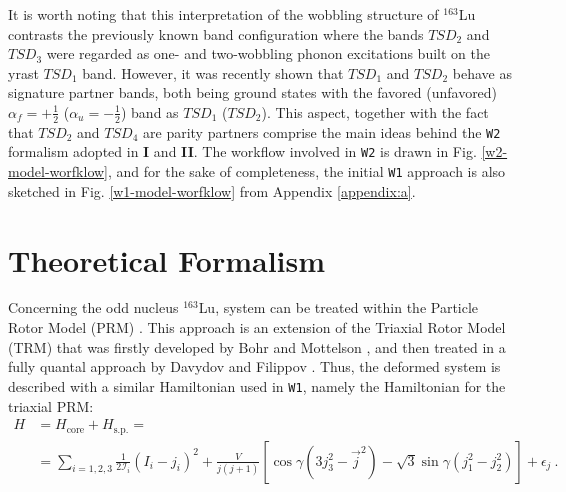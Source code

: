 \documentclass[myclassdoc,debug]{rjparticle}
\begin{document}
It is worth noting that this interpretation of the wobbling structure of $^{163}$Lu contrasts the previously known band configuration \cite{jensen2004coexisting,tanabe2006algebraic,frauendorf2014transverse} where the bands $TSD_2$ and $TSD_3$ were regarded as one- and two-wobbling phonon excitations built on the yrast $TSD_1$ band. However, it was recently shown \cite{raduta2020towards,raduta2020approach,raduta2020new} that $TSD_1$ and $TSD_2$ behave as signature partner bands, both being ground states with the favored (unfavored) $\alpha_f=+\frac{1}{2}$ ($\alpha_u=-\frac{1}{2}$) band as $TSD_1$ ($TSD_2$). This aspect, together with the fact that $TSD_2$ and $TSD_4$ are parity partners comprise the main ideas behind the \texttt{W2} formalism adopted in \textbf{I} and \textbf{II}. The workflow involved in \texttt{W2} is drawn in Fig. \ref{w2-model-worfklow}, and for the sake of completeness, the initial \texttt{W1} approach is also sketched in Fig. \ref{w1-model-worfklow} from Appendix \ref{appendix:a}.

\section{Theoretical Formalism}\label{section-theory}

Concerning the odd nucleus $^{163}$Lu, system can be treated within the Particle Rotor Model (PRM) \cite{hamamoto2002wobbling,hagemann2003quantized,frauendorf2014transverse}. This approach is an extension of the Triaxial Rotor Model (TRM) that was firstly developed by Bohr and Mottelson \cite{bohr1998nuclear}, and then treated in a fully quantal approach by Davydov and Filippov \cite{davydov1958rotational}. Thus, the deformed system is described with a similar Hamiltonian used in \texttt{W1}, namely the Hamiltonian for the triaxial PRM:
\begin{align}
    H&=H_\text{core}+H_\text{s.p.}=\nonumber\\
    &=\sum_{i=1,2,3}\frac{1}{2\mathcal{I}_i}(I_i-j_i)^2+\frac{V}{j(j+1)}\left[\cos\gamma(3j_3^2-\vec{j}^2)-\sqrt{3}\sin\gamma(j_1^2-j_2^2)\right]+\epsilon_j\ .
    \label{prm-hamiltonian}
\end{align}
\end{document}
